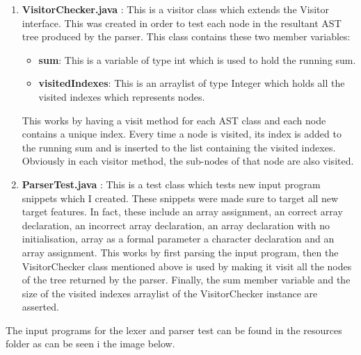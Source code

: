 \documentclass{article}
\begin{document}
				\begin{enumerate}
				\item \textbf{VisitorChecker.java} : This is a visitor class which extends the Visitor interface. This was created in order to test each node in the resultant AST tree produced by the parser. This class contains these two member variables:
				\begin{itemize}
				\item \textbf{sum}: This is a variable of type int which is used to hold the running sum.
				\item \textbf{visitedIndexes}: This is an arraylist of type Integer which holds all the visited indexes which represents nodes.
				\end{itemize}
				
				This works by having a visit method for each AST class and each node contains a unique index. Every time a node is visited, its index is added to the running sum and is inserted to the list containing the visited indexes. Obviously in each visitor method, the sub-nodes of that node are also visited.
				
				\item \textbf{ParserTest.java} : This is a test class which tests new input program snippets which I created. These snippets were made sure to target all new target features. In fact, these include an array assignment, an correct array declaration, an incorrect array declaration, an array declaration with no initialisation, array as a formal parameter a character declaration and an array assignment. This works by first parsing the input program, then the VisitorChecker class mentioned above is used by making it visit all the nodes of the tree returned by the parser. Finally, the sum member variable and the size of the visited indexes arraylist of the VisitorChecker instance are asserted.
		
				
				
				
				\end{enumerate}
				
				
				The input programs for the lexer and parser test can be found in the resources folder as can be seen i the image below.
				
\end{document}
